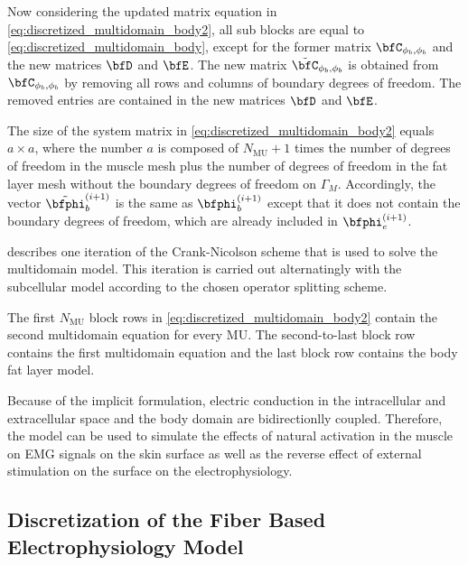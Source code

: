 Now considering the updated matrix equation in \cref{eq:discretized_multidomain_body2}, all sub blocks are equal to \cref{eq:discretized_multidomain_body}, except for the former matrix $\bfC_{\phi_b,\phi_b}$ and the new matrices $\bfD$ and $\bfE$. The new matrix $\tilde{\bfC}_{\phi_b,\phi_b}$ is obtained from $\bfC_{\phi_b,\phi_b}$ by removing all rows and columns of boundary degrees of freedom. The removed entries are contained in the new matrices $\bfD$ and $\bfE$.

The size of the system matrix in \cref{eq:discretized_multidomain_body2} equals $a\times a$, where the number $a$ is composed of $N_\text{MU}+1$ times the number of degrees of freedom in the muscle mesh plus the number of degrees of freedom in the fat layer mesh without the boundary degrees of freedom on $\Gamma_M$. Accordingly, the vector $\tilde{\bfphi}_b^{(i+1)}$ is the same as $\bfphi_b^{(i+1)}$ except that it does not contain the boundary degrees of freedom, which are already included in $\bfphi_e^{(i+1)}$.

 describes one iteration of the Crank-Nicolson scheme that is used to solve the multidomain model. This iteration is carried out alternatingly with the subcellular model according to the chosen operator splitting scheme. 

The first $N_\text{MU}$ block rows in \cref{eq:discretized_multidomain_body2} contain the second multidomain equation for every MU. The second-to-last block row contains the first multidomain equation and the last block row  contains the body fat layer model.

Because of the implicit formulation, electric conduction in the intracellular and extracellular space and the body domain are bidirectionlly coupled. Therefore, the model can be used to simulate the effects of natural activation in the muscle on EMG signals on the skin surface as well as the reverse effect of external stimulation on the surface on the electrophysiology.

\subsection{Discretization of the Fiber Based Electrophysiology Model}


